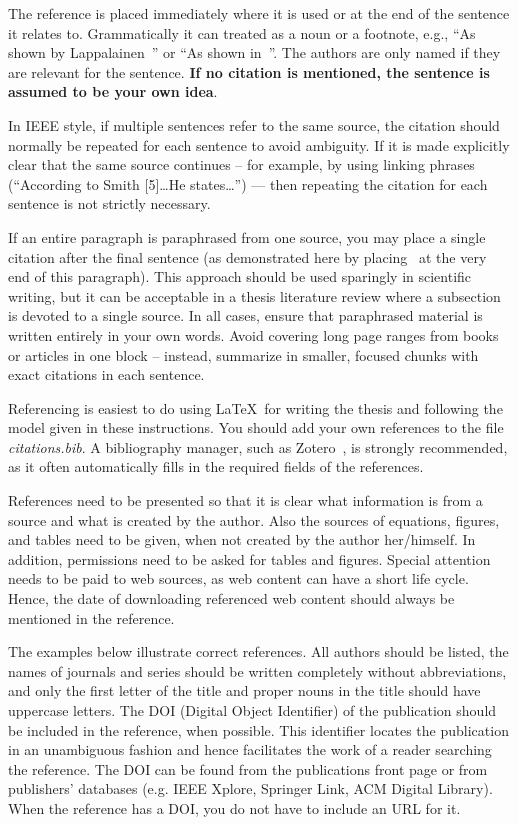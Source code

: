 The reference is placed immediately where it is used or at the end of
the sentence it relates to. Grammatically it can treated as a noun or
a footnote, e.g., ``As shown by Lappalainen~\cite{lappalainen}'' or
``As shown in~\cite{lappalainen}''. The authors are only named if they
are relevant for the sentence. \textbf{If no citation is mentioned,
the sentence is assumed to be your own idea}.

In IEEE style, if multiple sentences refer to the same source, the
citation should normally be repeated for each sentence to avoid
ambiguity. If it is made explicitly clear that the same source
continues -- for example, by using linking phrases (“According to Smith
[5]\ldots He states\ldots”) — then repeating the citation for each
sentence is not strictly necessary.

If an entire paragraph is paraphrased from one source, you may place a
single citation after the final sentence (as demonstrated here by
placing~\cite{lappalainen} at the very end of this paragraph). This
approach should be used sparingly in scientific writing, but it can be
acceptable in a thesis literature review where a subsection is devoted
to a single source. In all cases, ensure that paraphrased material is
written entirely in your own words. Avoid covering long page ranges
from books or articles in one block -- instead, summarize in smaller,
focused chunks with exact citations in each
sentence.~\cite{lappalainen}

Referencing is easiest to do using \LaTeX\ for writing the thesis and
following the model given in these instructions. You should add your
own references to the file \textit{citations.bib}. A bibliography
manager, such as Zotero~\cite{zotero,uniouluzotero}, is strongly
recommended, as it often automatically fills in the required fields
of the references. 

References need to be presented so that it is clear what information
is from a source and what is created by the author. Also the sources
of equations, figures, and tables need to be given, when not created
by the author her/himself. In addition, permissions need to be asked
for tables and figures. Special attention needs to be paid to web
sources, as web content can have a short life cycle. Hence, the date
of downloading referenced web content should always be mentioned in
the reference.

The examples below illustrate correct references. All authors should
be listed, the names of journals and series should be written
completely without abbreviations, and only the first letter of the
title and proper nouns in the title should have uppercase letters. The
DOI (Digital Object Identifier) of the publication should be included
in the reference, when possible. This identifier locates the
publication in an unambiguous fashion and hence facilitates the work
of a reader searching the reference. The DOI can be found from the
publications front page or from publishers’ databases (e.g. IEEE
Xplore, Springer Link, ACM Digital Library). When the reference has a
DOI, you do not have to include an URL for it.

